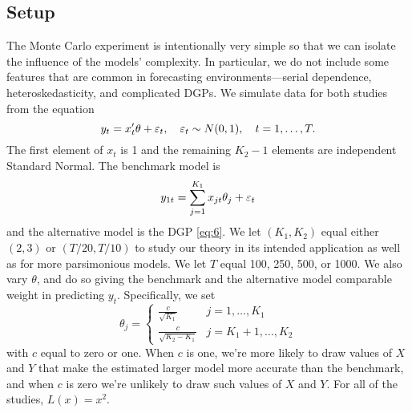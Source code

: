 \documentclass[12pt]{article}
\begin{document}
\subsection{Setup}
\label{sec:simulation-design}

The Monte Carlo experiment is intentionally very simple so that we can
isolate the influence of the models' complexity.  In particular, we do
not include some features that are common in forecasting
environments---serial dependence, heteroskedasticity, and complicated
DGPs.  We simulate data for both studies from the equation
\begin{equation}\label{eq:6}
  y_t = x_t'\theta + \varepsilon_t,\quad \varepsilon_t \sim N(0,1),
  \quad t=1,\dots,T.
\end{equation}
The first element of $x_t$ is 1 and the remaining $K_2-1$ elements are
independent Standard Normal.  The benchmark model is
\begin{equation}
  \label{eq:1}
  y_{1t} = \sum_{j=1}^{K_1} x_{jt}\theta_j + \varepsilon_t
\end{equation}
and the alternative model is the DGP \eqref{eq:6}.  We let
$(K_1,K_2)$ equal either $(2,3)$ or $(T/20,T/10)$ to study our theory
in its intended application as well as for more parsimonious models.
We let $T$ equal 100, 250, 500, or 1000.  We also vary $\theta$, and do
so giving the benchmark and the alternative model comparable weight in
predicting $y_t$.  Specifically, we set
\begin{equation*}
  \theta_j =
\begin{cases} \frac{c}{\sqrt{K_1}} & j = 1,\dots,K_1 \\
\frac{c}{\sqrt{K_2 - K_1}} & j = K_1 + 1,\dots,K_2 \end{cases}
\end{equation*}
with $c$ equal to zero or one.  When $c$ is one, we're more likely to
draw values of $X$ and $Y$ that make the estimated larger model more
accurate than the benchmark, and when $c$ is zero we're unlikely to
draw such values of $X$ and $Y$.  For all of the studies, $L(x) =
x^2$.
\end{document}
